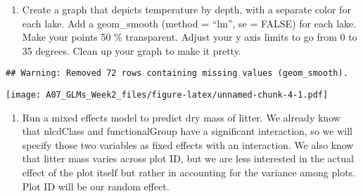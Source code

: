 \documentclass[]{article}
\newenvironment{Shaded}{\begin{snugshade}}{\end{snugshade}}
\newcommand{\CommentTok}[1]{\textcolor[rgb]{0.56,0.35,0.01}{\textit{#1}}}
\newcommand{\DataTypeTok}[1]{\textcolor[rgb]{0.13,0.29,0.53}{#1}}
\newcommand{\DecValTok}[1]{\textcolor[rgb]{0.00,0.00,0.81}{#1}}
\newcommand{\ErrorTok}[1]{\textcolor[rgb]{0.64,0.00,0.00}{\textbf{#1}}}
\newcommand{\FloatTok}[1]{\textcolor[rgb]{0.00,0.00,0.81}{#1}}
\newcommand{\KeywordTok}[1]{\textcolor[rgb]{0.13,0.29,0.53}{\textbf{#1}}}
\newcommand{\NormalTok}[1]{#1}
\newcommand{\OperatorTok}[1]{\textcolor[rgb]{0.81,0.36,0.00}{\textbf{#1}}}
\newcommand{\OtherTok}[1]{\textcolor[rgb]{0.56,0.35,0.01}{#1}}
\newcommand{\StringTok}[1]{\textcolor[rgb]{0.31,0.60,0.02}{#1}}
\providecommand{\tightlist}{%
  \setlength{\itemsep}{0pt}\setlength{\parskip}{0pt}}
\begin{document}
\begin{enumerate}
\def\labelenumi{\arabic{enumi}.}
\setcounter{enumi}{7}
\tightlist
\item
  Create a graph that depicts temperature by depth, with a separate
  color for each lake. Add a geom\_smooth (method = ``lm'', se = FALSE)
  for each lake. Make your points 50 \% transparent. Adjust your y axis
  limits to go from 0 to 35 degrees. Clean up your graph to make it
  pretty.
\end{enumerate}

\begin{Shaded}
\end{Shaded}

\begin{verbatim}
## Warning: Removed 72 rows containing missing values (geom_smooth).
\end{verbatim}

\texttt{[image: A07\_GLMs\_Week2\_files/figure-latex/unnamed-chunk-4-1.pdf]}

\begin{enumerate}
\def\labelenumi{\arabic{enumi}.}
\setcounter{enumi}{8}
\tightlist
\item
  Run a mixed effects model to predict dry mass of litter. We already
  know that nlcdClass and functionalGroup have a significant
  interaction, so we will specify those two variables as fixed effects
  with an interaction. We also know that litter mass varies across plot
  ID, but we are less interested in the actual effect of the plot itself
  but rather in accounting for the variance among plots. Plot ID will be
  our random effect.
\end{enumerate}
\end{document}
